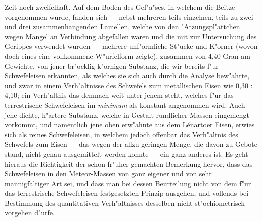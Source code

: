 \documentclass[a4paper, 11pt, oneside, german]{article}
\begin{document}
{{Zeit noch zweifelhaft. Auf dem Boden des Gef"a"ses, in welchem die Beitze vorgenommen wurde, fanden sich --- nebst mehreren teils einzelnen, teils zu zwei und drei zusammenhangenden Lamellen, welche von den "Atzungspl"attchen wegen Mangel an Verbindung abgefallen waren und die mit zur Untersuchung des Gerippes verwendet wurden --- mehrere unf"ormliche St"ucke und K"orner (wovon doch eines eine vollkommene W"urfelform zeigte), zusammen von 4,40 Gran am Gewichte, von jener br"ocklig-k"ornigen Substanz, die wir bereits f"ur Schwefeleisen erkannten, als welches sie sich auch durch die Analyse bew"ahrte, und zwar in einem Verh"altnisse des Schwefels zum metallischen Eisen wie 0,30 : 4,10; ein Verh"altnis das demnach weit unter jenem steht, welches f"ur das terrestrische Schwefeleisen im \emph{minimum} als konstant angenommen wird. Auch jene dichte, h"artere Substanz, welche in Gestalt rundlicher Massen eingemengt vorkommt, und namentlich jene oben erw"ahnte aus dem Lénartoer Eisen, erwies sich als reines Schwefeleisen, in welchem jedoch offenbar das Verh"altnis des Schwefels zum Eisen --- das wegen der allzu geringen Menge, die davon zu Gebote stand, nicht genau ausgemittelt werden konnte --- ein ganz anderes ist. Es geht hieraus die Richtigkeit der schon fr"uher gemachten Bemerkung hervor, dass das Schwefeleisen in den Meteor-Massen von ganz eigener und von sehr mannigfaltiger Art sei, und dass man bei dessen Beurteilung nicht von dem f"ur das terrestrische Schwefeleisen festgesetzten Prinzip ausgehen, und vollends bei Bestimmung des quantitativen Verh"altnisses desselben nicht st"ochiometrisch vorgehen d"urfe.\\
}}
\end{document}
